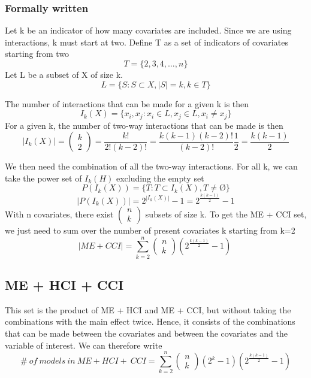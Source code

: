 \subsubsection{Formally written}


Let k be an indicator of how many covariates are included. Since we are using interactions, k must start at two. Define T as a set of indicators of covariates starting from two
\[T=\{\left.2,3,4,\dots ,n\right.\}\] 
Let L be a subset of X of size k.
\[L=\{\left.S:S\subset X,\left|S\right|=k,k\in T\right.\}\] 

\noindent The number of interactions that can be made for a given k is then
\[I_k\left(X\right)=\{\left.\left.x_i,x_j\right.:x_i\in L,x_j\in L,x_i\neq x_j\right.\}\] 
For a given k, the number of two-way interactions that can be made is then
\[\left|I_k\left(X\right)\right|=\left( \begin{array}{c}
k \\ 
2 \end{array}
\right)=\frac{k!}{2!\left(k-2\right)!}=\frac{k\left(k-1\right)\left(k-2\right)!}{\left(k-2\right)!}\frac{1}{2}=\frac{k\left(k-1\right)}{2}\] 

We then need the combination of all the two-way interactions. For all k, we can take the power set of $I_k\left(H\right)$ excluding the empty set
\[P\left(I_k\left(X\right)\right)=\{\left.T:T\subset I_k\left(X\right),T\neq \textrm{\O}\right.\}\] 
\[\left|P\left(I_k\left(X\right)\right)\right|=2^{\left|I_k\left(X\right)\right|}-1=2^{\frac{k\left(k-1\right)}{2}}-1\] 
With n covariates, there exist $\left( \begin{array}{c}
n \\ 
k \end{array}
\right)$ subsets of size k. To get the ME + CCI set, we just need to sum over the number of present covariates k starting from k=2
\[\left|ME+CCI\right|=\sum^n_{k=2}{\left( \begin{array}{c}
n \\ 
k \end{array}
\right)}\left(2^{\frac{k\left(k-1\right)}{2}}-1\right)\ \] 

\subsection{ME + HCI + CCI}
This set is the product of ME + HCI and ME + CCI, but without taking the combinations with the main effect twice. Hence, it consists of the combinations that can be made between the covariates and between the covariates and the variable of interest. We can therefore write 
\[\#\ of\ models\ in\ ME+HCI+\ CCI=\sum^n_{k=2}{\left( \begin{array}{c}
n \\ 
k \end{array}
\right)\left(2^k-1\right)\left(2^{\frac{k\left(k-1\right)}{2}}-1\right)}\] 
